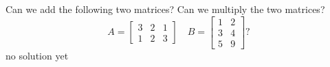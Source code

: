 {
Can we add the following two matrices? Can we multiply the two matrices?
\[A = 
\begin{bmatrix}
	3 & 2 & 1\\
	1 & 2 & 3
\end{bmatrix}
\quad 
B = 
\begin{bmatrix}
 1 & 2\\
 3 & 4\\
 5 & 9
\end{bmatrix}?
\]
}
{
no solution yet
}
